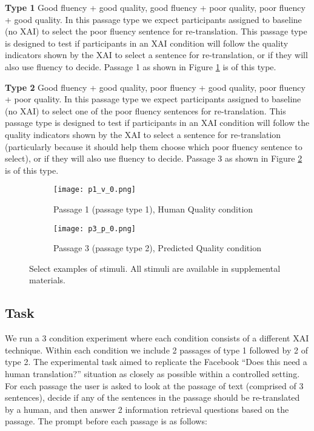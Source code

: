\begin{compacthang}
    \item \textbf{Type 1} Good fluency + good quality, good fluency + poor quality, poor fluency + good quality. In this passage type we expect participants assigned to baseline (no XAI) to select the poor fluency sentence for re-translation. This passage type is designed to test if participants in an XAI condition will follow the quality indicators shown by the XAI to select a sentence for re-translation, or if they will also use fluency to decide. Passage 1 as shown in Figure \ref{fig:p1_human_quality} is of this type.    

    \item \textbf{Type 2} Good fluency + good quality, poor fluency + good quality, poor fluency + poor quality. In this passage type we expect participants assigned to baseline (no XAI) to select one of the poor fluency sentences for re-translation. This passage type is designed to test if participants in an XAI condition will follow the quality indicators shown by the XAI to select a sentence for re-translation (particularly because it should help them choose which poor fluency sentence to select), or if they will also use fluency to decide. Passage 3 as shown in Figure \ref{fig:p3_predicted_quality} is of this type.     
\end{compacthang}

\begin{figure}
    \centering
    
    \begin{subfigure}[t]{0.45\textwidth}
        \centering
        \texttt{[image: p1\_v\_0.png]} 
        \caption{Passage 1 (passage type 1), Human Quality condition} \label{fig:p1_human_quality}
    \end{subfigure}
    \hfill
     \begin{subfigure}[t]{0.45\textwidth}
        \centering
        \texttt{[image: p3\_p\_0.png]} 
        \caption{Passage 3 (passage type 2), Predicted Quality condition} \label{fig:p3_predicted_quality}
    \end{subfigure}
    
    \caption{Select examples of stimuli. All stimuli are available in supplemental materials.}
    \label{fig:exp_stim}
    
\end{figure}

\subsection{Task} 
We run a 3 condition experiment where each condition consists of a different XAI technique. Within each condition we include 2 passages of type 1 followed by 2 of type 2. The experimental task aimed to replicate the Facebook “Does this need a human translation?” situation as closely as possible within a controlled setting. For each passage the user is asked to look at the passage of text (comprised of 3 sentences), decide if any of the sentences in the passage should be re-translated by a human, and then answer 2 information retrieval questions based on the passage. The prompt before each passage is as follows:

